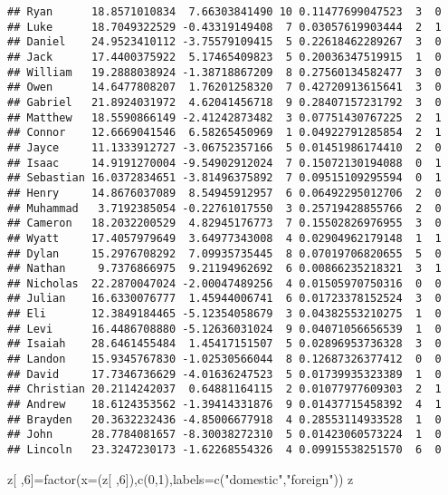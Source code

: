 \documentclass[
]{article}
\newenvironment{Shaded}{\begin{snugshade}}{\end{snugshade}}
\newcommand{\AttributeTok}[1]{\textcolor[rgb]{0.77,0.63,0.00}{#1}}
\newcommand{\DecValTok}[1]{\textcolor[rgb]{0.00,0.00,0.81}{#1}}
\newcommand{\FunctionTok}[1]{\textcolor[rgb]{0.00,0.00,0.00}{#1}}
\newcommand{\NormalTok}[1]{#1}
\newcommand{\OtherTok}[1]{\textcolor[rgb]{0.56,0.35,0.01}{#1}}
\newcommand{\StringTok}[1]{\textcolor[rgb]{0.31,0.60,0.02}{#1}}
\begin{document}
\begin{verbatim}
## Ryan      18.8571010834  7.66303841490 10 0.11477699047523  3  0
## Luke      18.7049322529 -0.43319149408  7 0.03057619903444  2  1
## Daniel    24.9523410112 -3.75579109415  5 0.22618462289267  3  0
## Jack      17.4400375922  5.17465409823  5 0.20036347519915  1  0
## William   19.2888038924 -1.38718867209  8 0.27560134582477  3  0
## Owen      14.6477808207  1.76201258320  7 0.42720913615641  3  0
## Gabriel   21.8924031972  4.62041456718  9 0.28407157231792  3  0
## Matthew   18.5590866149 -2.41242873482  3 0.07751430767225  2  1
## Connor    12.6669041546  6.58265450969  1 0.04922791285854  2  1
## Jayce     11.1333912727 -3.06752357166  5 0.01451986174410  2  0
## Isaac     14.9191270004 -9.54902912024  7 0.15072130194088  0  1
## Sebastian 16.0372834651 -3.81496375892  7 0.09515109295594  0  1
## Henry     14.8676037089  8.54945912957  6 0.06492295012706  2  0
## Muhammad   3.7192385054 -0.22761017550  3 0.25719428855766  2  0
## Cameron   18.2032200529  4.82945176773  7 0.15502826976955  3  0
## Wyatt     17.4057979649  3.64977343008  4 0.02904962179148  1  1
## Dylan     15.2976708292  7.09935735445  8 0.07019706820655  5  0
## Nathan     9.7376866975  9.21194962692  6 0.00866235218321  3  1
## Nicholas  22.2870047024 -2.00047489256  4 0.01505970750316  0  0
## Julian    16.6330076777  1.45944006741  6 0.01723378152524  3  0
## Eli       12.3849184465 -5.12354058679  3 0.04382553210275  1  0
## Levi      16.4486708880 -5.12636031024  9 0.04071056656539  1  0
## Isaiah    28.6461455484  1.45417151507  5 0.02896953736328  3  0
## Landon    15.9345767830 -1.02530566044  8 0.12687326377412  0  0
## David     17.7346736629 -4.01636247523  5 0.01739935323389  1  0
## Christian 20.2114242037  0.64881164115  2 0.01077977609303  2  1
## Andrew    18.6124353562 -1.39414331876  9 0.01437715458392  4  1
## Brayden   20.3632232436 -4.85006677918  4 0.28553114933528  1  0
## John      28.7784081657 -8.30038272310  5 0.01423060573224  1  0
## Lincoln   23.3247230173 -1.62268554326  4 0.09915538251570  6  0
\end{verbatim}

\begin{Shaded}
\begin{Highlighting}[]
\NormalTok{z[ ,}\DecValTok{6}\NormalTok{]}\OtherTok{=}\FunctionTok{factor}\NormalTok{(}\AttributeTok{x=}\NormalTok{(z[ ,}\DecValTok{6}\NormalTok{]),}\FunctionTok{c}\NormalTok{(}\DecValTok{0}\NormalTok{,}\DecValTok{1}\NormalTok{),}\AttributeTok{labels=}\FunctionTok{c}\NormalTok{(}\StringTok{"domestic"}\NormalTok{,}\StringTok{"foreign"}\NormalTok{))}
\NormalTok{z}
\end{Highlighting}
\end{Shaded}
\end{document}
